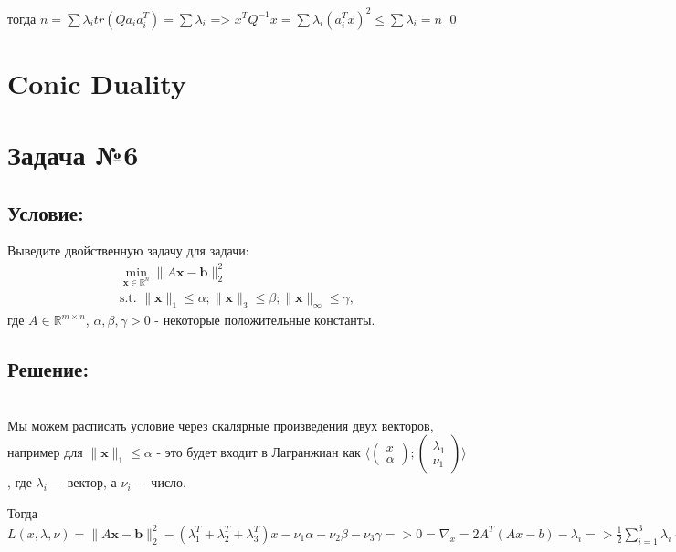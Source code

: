 \documentclass[a4paper,12pt]{article}
\begin{document}
тогда $n = \sum \lambda_i tr(Q a_i a_i^T) = \sum \lambda_i$ => $x^TQ^{-1}x = \sum \lambda_i(a_i^T x)^2 \leq \sum \lambda_i = n $  \qed

\newpage
\section*{Conic Duality}
\section*{Задача №6}
\subsection*{Условие:}

Выведите двойственную задачу для задачи:
        \begin{equation*}
        \begin{aligned}
      \min_{\mathbf{x}\in\mathbb{R}^n} \|A\mathbf{x}-\mathbf{b}\|_2^2 \\
        \text{s.t. } \|\mathbf{x}\|_1\leq \alpha; \|\mathbf{x}\|_3\leq \beta; \|\mathbf{x}\|_{\infty}\leq \gamma,
        \end{aligned}
    \end{equation*}
где $A\in\mathbb{R}^{m\times n}$, $\alpha,\beta,\gamma>0$ - некоторые положительные константы.

\subsection*{Решение:} \\

Мы можем расписать условие через скалярные произведения двух векторов, например для $\|\mathbf{x}\|_1\leq \alpha$ - это будет входит в Лагранжиан как $\langle \begin{pmatrix} x \\ \alpha \end{pmatrix}; \begin{pmatrix} \lambda_1 \\ \nu_1 \end{pmatrix} \rangle$, где $\lambda_i - $ вектор, а $\nu_i - $ число.

Тогда $L(x, \lambda, \nu) = \|A\mathbf{x}-\mathbf{b}\|_2^2 - (\lambda_1^T + \lambda_2^T + \lambda_3^T) x - \nu_1 \alpha - \nu_2 \beta - \nu_3 \gamma => 0 = \nabla_x = 2A^T(Ax -b) - \lambda_i =>\frac{1}{2} \sum \limits_{i=1}^3 \lambda_i + A^Tb = A^TAx => x = (A^TA)^{-1}(\frac{1}{2} \sum \limits_{i=1}^3 \lambda_i + A^Tb)$
\end{document}
